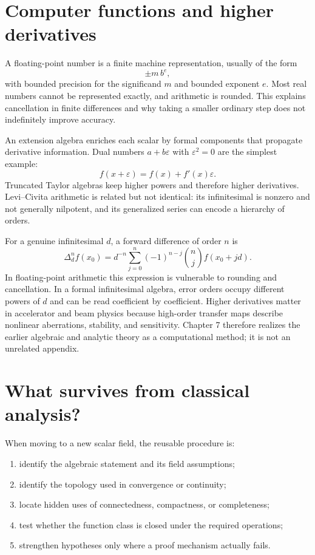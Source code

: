 \documentclass[11pt,a4paper]{article}
\theoremstyle{remark}
\begin{document}
\section{Computer functions and higher derivatives}

A floating-point number is a finite machine representation, usually of the form
\[
\pm m\,b^e,
\]
with bounded precision for the significand $m$ and bounded exponent $e$. Most real numbers cannot
be represented exactly, and arithmetic is rounded. This explains cancellation in finite
differences and why taking a smaller ordinary step does not indefinitely improve accuracy.

An extension algebra enriches each scalar by formal components that propagate derivative
information. Dual numbers $a+b\varepsilon$ with $\varepsilon^2=0$ are the simplest example:
\[
f(x+\varepsilon)=f(x)+f'(x)\varepsilon.
\]
Truncated Taylor algebras keep higher powers and therefore higher derivatives. Levi--Civita
arithmetic is related but not identical: its infinitesimal is nonzero and not generally nilpotent,
and its generalized series can encode a hierarchy of orders.

For a genuine infinitesimal $d$, a forward difference of order $n$ is
\[
\Delta_d^n f(x_0)=
d^{-n}\sum_{j=0}^{n}(-1)^{n-j}\binom nj f(x_0+jd).
\]
In floating-point arithmetic this expression is vulnerable to rounding and cancellation. In a
formal infinitesimal algebra, error orders occupy different powers of $d$ and can be read
coefficient by coefficient. Higher derivatives matter in accelerator and beam physics because
high-order transfer maps describe nonlinear aberrations, stability, and sensitivity. Chapter 7
therefore realizes the earlier algebraic and analytic theory as a computational method; it is not
an unrelated appendix.

\section{What survives from classical analysis?}

When moving to a new scalar field, the reusable procedure is:
\begin{enumerate}
\item identify the algebraic statement and its field assumptions;
\item identify the topology used in convergence or continuity;
\item locate hidden uses of connectedness, compactness, or completeness;
\item test whether the function class is closed under the required operations;
\item strengthen hypotheses only where a proof mechanism actually fails.
\end{enumerate}
\end{document}
